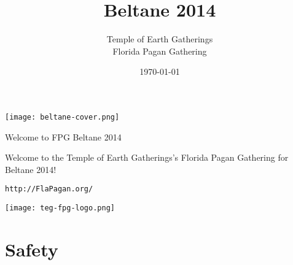 \documentclass[9pt,twoside,openright,final,article,letterpaper]{memoir}
\date{\today}
\title{Beltane 2014}
\author{Temple of Earth Gatherings \\ Florida Pagan Gathering}
\let\oldsection=\section
\renewcommand{\section}[1]{%
  \nopagebreak
  \vspace{6pt} %
  \needspace{1.5in}
  \oldsection{#1}
  \nopagebreak}
\begin{document}
\thispagestyle{empty}
\vfill
\texttt{[image: beltane-cover.png]}
\vfill

\pagestyle{headings}
\newpage
\thispagestyle{headings}

{\hminfamily \HUGE Welcome to FPG Beltane 2014}

\begin{multicols}{2}

  \tableofcontents*

  \columnbreak

  Welcome to the Temple of Earth Gatherings's Florida Pagan Gathering
  for Beltane 2014!

  \texttt{http://FlaPagan.org/}

  \centering
  \texttt{[image: teg-fpg-logo.png]}

\end{multicols}

\vspace{1pt}
\vfill

\section{Safety}
\end{document}
